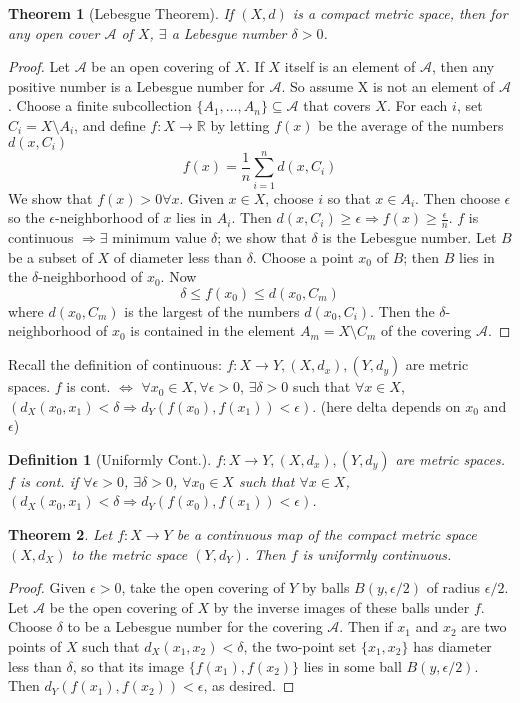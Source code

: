 \documentclass[article,11pt, reqno]{article}
\newtheorem*{theorem}{Theorem}
\newtheorem*{definition}{Definition}
\theoremstyle{remark}
\newcommand{\R}{\mathbb{R}}
\newcommand{\Ra}{\Rightarrow}
\newcommand{\mc}{\mathcal}
\newcommand{\ra}{\rightarrow}
\newcommand{\<}{\langle}
\renewcommand{\>}{\rangle}
\newcommand{\ex}{\exists}
\begin{document}
\begin{theorem}[Lebesgue Theorem]
    If $(X,d)$ is a compact metric space, then for any open cover $\mathcal{A}$ of $X$, $\exists$ a Lebesgue number $\delta>0$.
\end{theorem}
\begin{proof}
    Let $\mc A$ be an open covering of $X$. If $X$ itself is an element of $\mc A$, then any positive number is a Lebesgue number for $\mc A$. So assume X is not an element of $\mc A$. Choose a finite subcollection $\{A_1,\dots, A_n\}\subseteq\mc A$ that covers $X$. For each $i$, set $C_i =X\setminus A_i$, and define $f: X\ra \R$ by letting $f(x)$ be the average of the numbers $d(x,C_i)$ 
    $$
        f(x)=\frac{1}{n}\sum_{i=1}^{n}d(x,C_i)
    $$
    We show that $f (x ) > 0\forall x$. Given $x\in X$, choose $i$ so that $x\in A_i$. Then choose $\epsilon$ so the $\epsilon$-neighborhood of $x$ lies in $A_i$. Then $d(x,C_i)\geq\epsilon\Ra f(x)\geq \frac{\epsilon}{n}$. $f$ is continuous $\Ra\ex$ minimum value $\delta$; we show that $\delta$ is the Lebesgue number. Let $B$ be a subset of $X$ of diameter less than $\delta$. Choose a point $x_0$ of $B$; then $B$ lies in the $\delta$-neighborhood of $x_0$. Now 
    $$
        \delta\leq f(x_0)\leq d(x_0,C_m)
    $$
    where $d(x_0,C_m)$ is the largest of the numbers $d(x_0,C_i)$. Then the $\delta$-neighborhood of $x_0$ is contained in the element $A_m = X\setminus C_m$ of the covering $\mc A$.
\end{proof}
\noindent
Recall the definition of continuous: $f:X\rightarrow Y,(X,d_x),(Y,d_y)$ are metric spaces. $f$ is cont. $\iff$ $\forall x_0\in X,\forall\epsilon>0$, $\exists\delta>0$ such that $\forall x\in X$, $(d_X(x_0,x_1)<\delta\Rightarrow d_Y(f(x_0),f(x_1))<\epsilon)$. (here delta depends on $x_0$ and $\epsilon$)
\begin{definition}[Uniformly Cont.]
    $f:X\rightarrow Y,(X,d_x),(Y,d_y)$ are metric spaces. $f$ is cont. if $\forall\epsilon>0$, $\exists\delta>0$, $\forall x_0\in X$ such that $\forall x\in X$, $(d_X(x_0,x_1)<\delta\Rightarrow d_Y(f(x_0),f(x_1))<\epsilon)$. 
\end{definition}
\begin{theorem}
    Let $f : X\ra Y$ be a continuous map of the compact metric space $(X, d_X )$ to the metric space $(Y, d_Y )$. Then $f$ is uniformly continuous.
\end{theorem}
\begin{proof}
    Given $\epsilon> 0$, take the open covering of $Y$ by balls $B(y, \epsilon/2)$ of radius $\epsilon/2$. Let $\mc A$ be the open covering of $X$ by the inverse images of these balls under $f$. Choose $\delta$ to be a Lebesgue number for the covering $\mc A$. Then if $x_1$ and $x_2$ are two points of $X$ such that $d_X (x_1, x_2) <\delta$, the two-point set $\{x_1, x_2\}$ has diameter less than $\delta$, so that its image $\{f(x_1), f(x_2)\}$ lies in some ball $B(y, \epsilon/2)$. Then $d_Y(f(x_1), f(x_2))< \epsilon$, as desired.
\end{proof}
\end{document}

